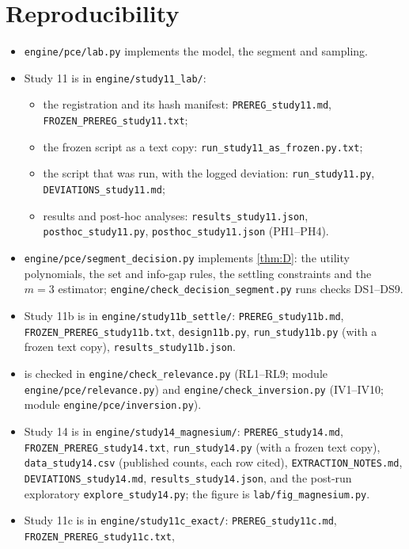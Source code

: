 \documentclass[11pt]{article}
\theoremstyle{definition}\newtheorem{definition}{Definition}\newtheorem{remark}{Remark}
\begin{document}
\section{Reproducibility}
{\raggedright
\begin{itemize}
\item \texttt{engine/pce/lab.py} implements the model, the segment and sampling.
\item Study 11 is in \texttt{engine/study11\_lab/}:
  \begin{itemize}
  \item the registration and its hash manifest: \texttt{PREREG\_study11.md}, \texttt{FROZEN\_PREREG\_study11.txt};
  \item the frozen script as a text copy: \texttt{run\_study11\_as\_frozen.py.txt};
  \item the script that was run, with the logged deviation: \texttt{run\_study11.py}, \texttt{DEVIATIONS\_study11.md};
  \item results and post-hoc analyses: \texttt{results\_study11.json}, \texttt{posthoc\_study11.py}, \texttt{posthoc\_study11.json} (PH1--PH4).
  \end{itemize}
\item \texttt{engine/pce/segment\_decision.py} implements \cref{thm:D}: the utility polynomials, the set and info-gap rules, the
  settling constraints and the $m=3$ estimator; \texttt{engine/check\_decision\_segment.py} runs checks DS1--DS9.
\item Study 11b is in \texttt{engine/study11b\_settle/}: \texttt{PREREG\_study11b.md}, \texttt{FROZEN\_PREREG\_study11b.txt},
  \texttt{design11b.py}, \texttt{run\_study11b.py} (with a frozen text copy), \texttt{results\_study11b.json}.
\item {} is checked in \texttt{engine/check\_relevance.py} (RL1--RL9; module \texttt{engine/pce/relevance.py}) and
  \texttt{engine/check\_inversion.py} (IV1--IV10; module \texttt{engine/pce/inversion.py}).
\item Study 14 is in \texttt{engine/study14\_magnesium/}: \texttt{PREREG\_study14.md}, \texttt{FROZEN\_PREREG\_study14.txt},
  \texttt{run\_study14.py} (with a frozen text copy), \texttt{data\_study14.csv} (published counts, each row cited),
  \texttt{EXTRACTION\_NOTES.md}, \texttt{DEVIATIONS\_study14.md}, \texttt{results\_study14.json}, and the post-run exploratory
  \texttt{explore\_study14.py}; the figure is \texttt{lab/fig\_magnesium.py}.
\item Study 11c is in \texttt{engine/study11c\_exact/}: \texttt{PREREG\_study11c.md}, \texttt{FROZEN\_PREREG\_study11c.txt},

\end{itemize}}
\end{document}
